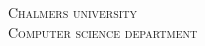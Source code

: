 
\begin{center}
	\parbox[s][4cm][s]{10cm}{\scshape \large
	Chalmers university\\Computer science department}
	\vskip 2cm {\Huge \bfseries \nazovUlohy}
	\vskip 1cm {\Large \tema}
\end{center}

\vfill

\begin{flushright}
	\author \\
	\email \\ 
	~\\
	\date
\end{flushright}

\newpage
\pagestyle{fancy}

